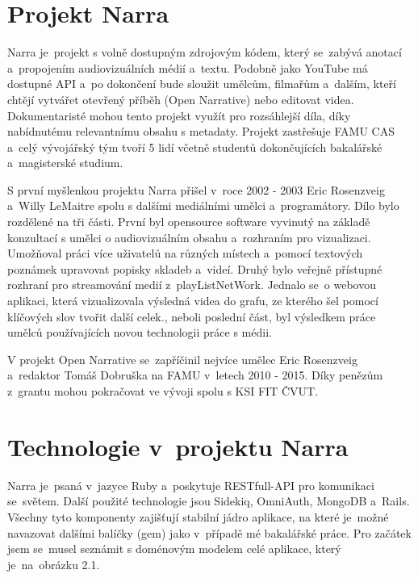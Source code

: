 \section{Projekt Narra}
\par Narra\cite{narra} je~projekt s volně dostupným zdrojovým kódem, který se~zabývá anotací a~propojením audiovizuálních médií a~textu. Podobně jako YouTube má dostupné API a~po dokončení bude sloužit umělcům, filmařům a~dalším, kteří chtějí vytvářet otevřený příběh (Open Narrative) nebo editovat videa. Dokumentaristé mohou tento projekt využít pro rozsáhlejší díla, díky nabídnutému relevantnímu obsahu s metadaty. Projekt zastřešuje FAMU CAS a~celý vývojářský tým tvoří 5 lidí včetně studentů dokončujících bakalářské a~magisterské studium.
\par S první myšlenkou projektu Narra přišel v~roce 2002 - 2003 Eric Rosenzveig a~Willy LeMaitre spolu s dalšími mediálními umělci a~programátory. Dílo bylo rozdělené na tři části. První byl opensource software vyvinutý na základě konzultací s umělci o audiovizuálním obsahu a~rozhraním pro vizualizaci. Umožňoval práci více uživatelů na různých místech a~pomocí textových poznámek upravovat popisky skladeb a~videí. Druhý bylo veřejně přístupné rozhraní pro streamování medií z~playListNetWork. Jednalo se~o webovou aplikaci, která vizualizovala výsledná videa do grafu, ze kterého šel pomocí klíčových slov tvořit další celek., neboli poslední část, byl výsledkem práce umělců používajících novou technologii práce s médii.
\par V projekt Open Narrative se~zapříčinil nejvíce umělec Eric Rosenzveig a~redaktor Tomáš Dobruška na FAMU v~letech 2010 - 2015. Díky penězům z~grantu mohou pokračovat ve vývoji spolu s KSI FIT ČVUT.

\section{Technologie v~projektu Narra} 
\par Narra je~psaná v~jazyce Ruby a~poskytuje RESTfull-API pro komunikaci se~světem. Další použité technologie jsou Sidekiq, OmniAuth, MongoDB a~Rails. Všechny tyto komponenty zajišťují stabilní jádro aplikace, na které je~možné navazovat dalšími balíčky (gem) jako v~případě mé bakalářské práce. Pro začátek jsem se~musel seznámit s doménovým modelem\cite{michalmoc} celé aplikace, který je~na~obrázku 2.1.

